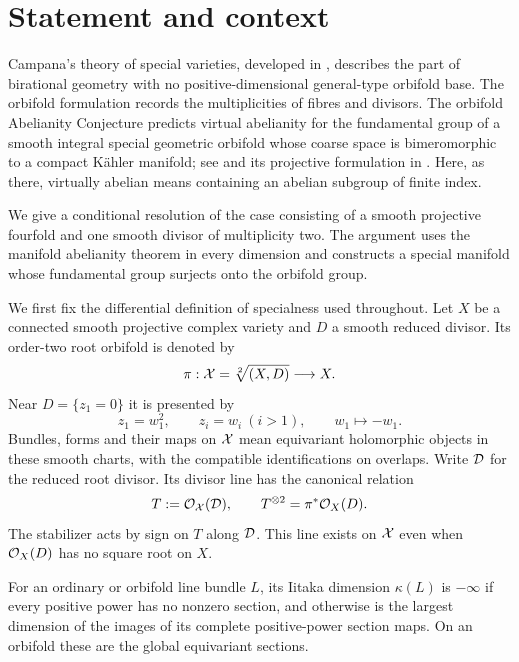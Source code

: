 \section{Statement and context}

Campana's theory of special varieties, developed in \cite{Campana2004}, describes the part of birational geometry with no positive-dimensional general-type orbifold base. The orbifold formulation records the multiplicities of fibres and divisors. The orbifold Abelianity Conjecture predicts virtual abelianity for the fundamental group of a smooth integral special geometric orbifold whose coarse space is bimeromorphic to a compact K\"ahler manifold; see \cite[Conjecture~12.10(1)]{CampanaOrbifolds} and its projective formulation in \cite[Conjecture~11.2]{CampanaSurvey}. Here, as there, virtually abelian means containing an abelian subgroup of finite index.

We give a conditional resolution of the case consisting of a smooth projective fourfold and one smooth divisor of multiplicity two. The argument uses the manifold abelianity theorem in every dimension and constructs a special manifold whose fundamental group surjects onto the orbifold group.

We first fix the differential definition of specialness used throughout. Let $X$ be a connected smooth projective complex variety and $D$ a smooth reduced divisor. Its order-two root orbifold is denoted by
\[
 \pi:\mathcal X=\sqrt[2]{(X,D)}\longrightarrow X.
\]
Near $D=\{z_1=0\}$ it is presented by
\begin{equation}\label{eq:root-chart}
 z_1=w_1^2,\qquad z_i=w_i\ (i>1),
 \qquad w_1\longmapsto-w_1.
\end{equation}
Bundles, forms and their maps on $\mathcal X$ mean equivariant holomorphic objects in these smooth charts, with the compatible identifications on overlaps. Write $\mathcal D$ for the reduced root divisor. Its divisor line has the canonical relation
\begin{equation}\label{eq:root-line}
 T:=\mathcal O_{\mathcal X}(\mathcal D),\qquad T^{\otimes2}=\pi^*\mathcal O_X(D).
\end{equation}
The stabilizer acts by sign on $T$ along $\mathcal D$. This line exists on $\mathcal X$ even when $\mathcal O_X(D)$ has no square root on $X$.

For an ordinary or orbifold line bundle $L$, its Iitaka dimension $\kappa(L)$ is $-\infty$ if every positive power has no nonzero section, and otherwise is the largest dimension of the images of its complete positive-power section maps. On an orbifold these are the global equivariant sections.

